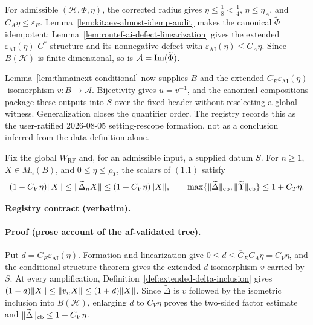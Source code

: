 For admissible $(\mathcal H,\Phi,\eta)$, the corrected radius gives
$\eta\le\tfrac18<\tfrac14$, $\eta\le\eta_A$, and $C_A\eta\le\varepsilon_E$.
Lemma~\ref{lem:kitaev-almost-idemp-audit} makes the canonical $\widetilde\Phi$
idempotent; Lemma~\ref{lem:routef-ai-defect-linearization} gives the extended
$\varepsilon_{\mathrm{AI}}(\eta)$-$C^*$ structure and its nonnegative defect with
$\varepsilon_{\mathrm{AI}}(\eta)\le C_A\eta$.  Since $B(\mathcal H)$ is
finite-dimensional, so is $\mathcal A=\operatorname{Im}(\widetilde\Phi)$.

Lemma~\ref{lem:thmainext-conditional} now supplies $B$ and the extended
$C_E\varepsilon_{\mathrm{AI}}(\eta)$-isomorphism $v:B\to\mathcal A$.
Bijectivity gives $u=v^{-1}$, and the canonical compositions package these outputs into
$S$ over the fixed header without reselecting a global witness.  Generalization closes
the quantifier order.  The registry records this as the user-ratified 2026-08-05
setting-rescope formation, not as a conclusion inferred from the data definition alone.

\begin{lemma}\label{lem:routef-raw-factor-norms}
Fix the global $W_{\mathrm{RF}}$ and, for an admissible input, a supplied datum $S$.
For $n\ge1$, $X\in M_n(B)$, and $0\le\eta\le\rho_T$, the scalars of $(1.1)$ satisfy
\[
 (1-C_V\eta)\lVert X\rVert\le\lVert \widetilde\Delta_nX\rVert
 \le(1+C_V\eta)\lVert X\rVert,
 \qquad
 \max\{\lVert \widetilde\Delta\rVert_{\mathrm{cb}},
          \lVert \widetilde\Upsilon\rVert_{\mathrm{cb}}\}\le1+C_T\eta.
\]
\end{lemma}
\noindent\textbf{Registry contract (verbatim).}
\paragraph{Proof (prose account of the af-validated tree).}
Put $d=C_E\varepsilon_{\mathrm{AI}}(\eta)$.  Formation and linearization give
$0\le d\le\overline C_EC_A\eta=C_V\eta$, and the conditional structure theorem gives
the extended $d$-isomorphism $v$ carried by $S$.  At every amplification,
Definition~\ref{def:extended-delta-inclusion} gives
$(1-d)\lVert X\rVert\le\lVert v_nX\rVert\le(1+d)\lVert X\rVert$.  Since
$\widetilde\Delta$ is $v$ followed by the isometric inclusion into $B(\mathcal H)$,
enlarging $d$ to $C_V\eta$ proves the two-sided factor estimate and
$\lVert \widetilde\Delta\rVert_{\mathrm{cb}}\le1+C_V\eta$.

